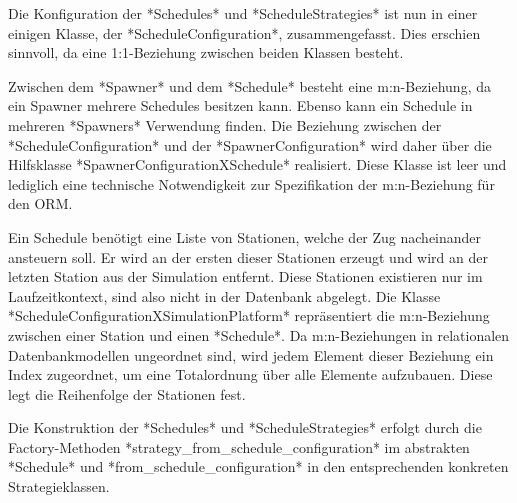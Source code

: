 Die Konfiguration der *Schedules* und *ScheduleStrategies* ist nun in einer einigen Klasse, der *ScheduleConfiguration*, zusammengefasst. Dies erschien sinnvoll, da eine 1:1-Beziehung zwischen beiden Klassen besteht. 

Zwischen dem *Spawner* und dem *Schedule* besteht eine m:n-Beziehung, da ein Spawner mehrere Schedules besitzen kann. Ebenso kann ein Schedule in mehreren *Spawners* Verwendung finden. Die Beziehung zwischen der *ScheduleConfiguration* und der *SpawnerConfiguration* wird daher über die Hilfsklasse *SpawnerConfigurationXSchedule* realisiert. Diese Klasse ist leer und lediglich eine technische Notwendigkeit zur Spezifikation der m:n-Beziehung für den ORM.

Ein Schedule benötigt eine Liste von Stationen, welche der Zug nacheinander ansteuern soll. Er wird an der ersten dieser Stationen erzeugt und wird an der letzten Station aus der Simulation entfernt. Diese Stationen existieren nur im Laufzeitkontext, sind also nicht in der Datenbank abgelegt. Die Klasse *ScheduleConfigurationXSimulationPlatform* repräsentiert die m:n-Beziehung zwischen einer Station und einen *Schedule*. Da m:n-Beziehungen in relationalen Datenbankmodellen ungeordnet sind, wird jedem Element dieser Beziehung ein Index zugeordnet, um eine Totalordnung über alle Elemente aufzubauen. Diese legt die Reihenfolge der Stationen fest.

Die Konstruktion der *Schedules* und *ScheduleStrategies* erfolgt durch die Factory-Methoden *strategy\_from\_schedule\_configuration* im abstrakten *Schedule* und *from\_schedule\_configuration* in den entsprechenden konkreten Strategieklassen.
